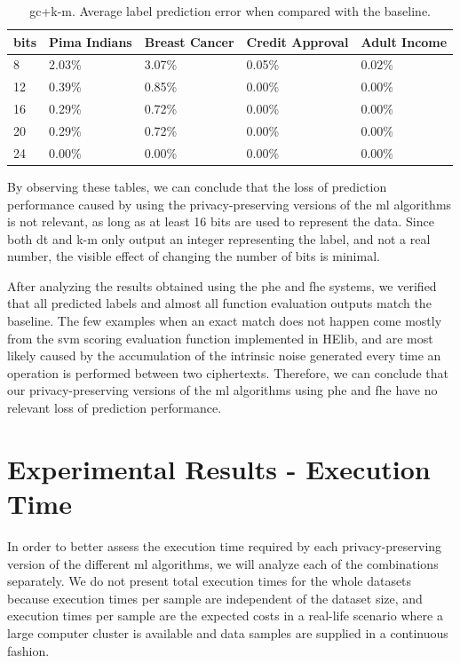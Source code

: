 \begin{table}[htp]
\centering
\caption{\acs{gc}+\acs{k-m}. Average label prediction error when compared with the baseline.}
\label{table:avgErrorKM}
\begin{tabular}{|l|l|l|l|l|}
\hline
\textbf{bits} & \textbf{Pima Indians} & \textbf{Breast Cancer} & \textbf{Credit Approval} & \textbf{Adult Income} \\ \hline
8    & 2.03\%       & 3.07\%        &    0.05\%       &     0.02\%   \\ \hline
12   & 0.39\%       & 0.85\%        &    0.00\%       &     0.00\%   \\ \hline
16   & 0.29\%       & 0.72\%        &    0.00\%       &     0.00\%   \\ \hline
20   & 0.29\%       & 0.72\%        &    0.00\%       &     0.00\%   \\ \hline
24   & 0.00\%       & 0.00\%        &    0.00\%       &     0.00\%   \\ \hline
\end{tabular}
\end{table}

By observing these tables, we can conclude that the loss of prediction performance caused by using the privacy-preserving versions of the \ac{ml} algorithms is not relevant, as long as at least 16 bits are used to represent the data. Since both \ac{dt} and \ac{k-m} only output an integer representing the label, and not a real number, the visible effect of changing the number of bits is minimal.

After analyzing the results obtained using the \ac{phe} and \ac{fhe} systems, we verified that all predicted labels and almost all function evaluation outputs match the baseline. The few examples when an exact match does not happen come mostly from the \ac{svm} scoring evaluation function implemented in HElib, and are most likely caused by the accumulation of the intrinsic noise generated every time an operation is performed between two ciphertexts. Therefore, we can conclude that our privacy-preserving versions of the \ac{ml} algorithms using \ac{phe} and \ac{fhe} have no relevant loss of prediction performance.

\section{Experimental Results - Execution Time}
\label{sec:ExperimentalResultsExecutionTime}
In order to better assess the execution time required by each privacy-preserving version of the different \ac{ml} algorithms, we will analyze each of the combinations separately. We do not present total execution times for the whole datasets because execution times per sample are independent of the dataset size, and execution times per sample are the expected costs in a real-life scenario where a large computer cluster is available and data samples are supplied in a continuous fashion.


